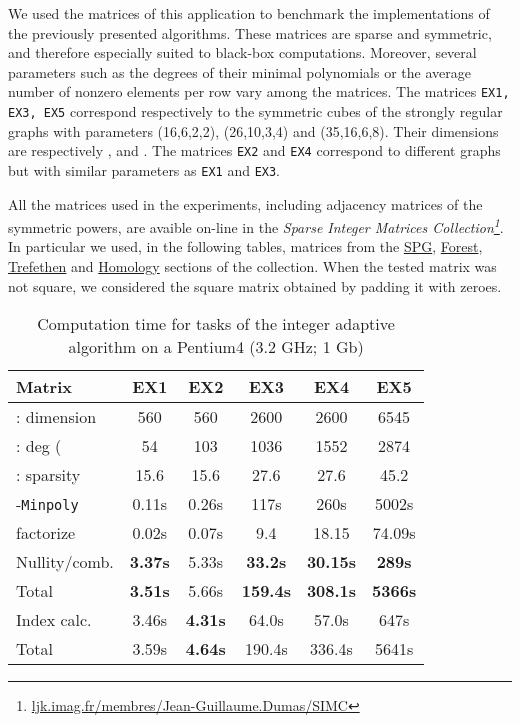 \documentclass{article}
\begin{document}
We used the matrices of this application to benchmark the implementations of the
previously presented algorithms.
These matrices are sparse and symmetric, and therefore especially suited to black-box
computations.
Moreover, several parameters such as the degrees of their
minimal polynomials or the average number  of nonzero elements per row
vary among the matrices. The matrices \texttt{EX1, EX3, EX5} correspond
respectively to the symmetric cubes of the strongly regular graphs with
parameters (16,6,2,2), (26,10,3,4) and (35,16,6,8). Their dimensions are
respectively
,  and .
The matrices \texttt{EX2} and \texttt{EX4} correspond to different graphs but
with similar parameters as \texttt{EX1} and \texttt{EX3}.

All the matrices used in the experiments, including adjacency matrices
of the symmetric powers, are avaible on-line in the {\em Sparse Integer
Matrices
Collection\footnote{\url{ljk.imag.fr/membres/Jean-Guillaume.Dumas/SIMC}}}.
In particular we used, in the following tables, matrices from the
\url{SPG}, \url{Forest}, \url{Trefethen} and  \url{Homology} sections of the
collection. When the tested matrix was not square, we considered the
square matrix obtained by padding it with zeroes.

\begin{table}[hptb]
\begin{center}
{\small
\begin{tabular}{lccccc}
\toprule
Matrix           &  EX1 & EX2 & EX3 & EX4 & EX5 \\ 
\midrule
: dimension   & 560  & 560 & 2600 & 2600 & 6545 \\
: deg ( & 54  & 103 & 1036 & 1552 & 2874  \\
: sparsity & 15.6 & 15.6 & 27.6 & 27.6 & 45.2\\
\midrule
-\texttt{Minpoly} & 0.11s & 0.26s & 117s & 260s & 5002s  \\
\midrule
 factorize& 0.02s & 0.07s & 9.4 & 18.15 & 74.09s \\
\midrule
Nullity/comb.& \textbf{3.37s} & 5.33s & \textbf{33.2s} & \textbf{30.15s} &\textbf{289s} \\
Total& \textbf{3.51s} & 5.66s & \textbf{159.4s} & \textbf{308.1s} & \textbf{5366s}\\
\midrule
Index calc.  & 3.46s & \textbf{4.31s} & 64.0s & 57.0s & 647s\\
Total&  3.59s & \textbf{4.64s} & 190.4s & 336.4s & 5641s\\
\bottomrule
\end{tabular}
}
\end{center}
\caption{Computation time for tasks of the integer adaptive algorithm on a
  Pentium4 (3.2 GHz; 1 Gb)}\label{table:timings} 

\end{table}
\end{document}
